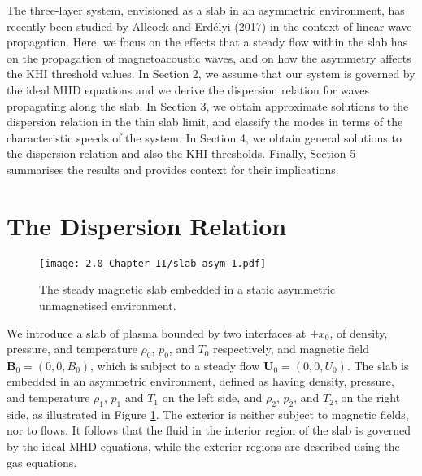 The three-layer system, envisioned as a slab in an asymmetric environment, has recently been studied by Allcock and Erd\'elyi (2017) in the context of linear wave propagation.
Here, we focus on the effects that a steady flow within the slab has on the propagation of magnetoacoustic waves, and on how the asymmetry affects the KHI threshold values.
In Section 2, we assume that our system is governed by the ideal MHD equations and we derive the dispersion relation for waves propagating along the slab.
In Section 3, we obtain approximate solutions to the dispersion relation in the thin slab limit, and classify the modes in terms of the characteristic speeds of the system.
In Section 4, we obtain general solutions to the dispersion relation and also the KHI thresholds.
Finally, Section 5 summarises the results and provides context for their implications.

\section{The Dispersion Relation}

\begin{figure}[t]
\centering
 \texttt{[image: 2.0\_Chapter\_II/slab\_asym\_1.pdf]}
 \caption{The steady magnetic slab embedded in a static asymmetric unmagnetised environment.}
 \label{slab}
\end{figure}

We introduce a slab of plasma bounded by two interfaces at $\pm x_0$, of density, pressure, and temperature $\rho_0$, $p_0$, and $T_0$ respectively, and magnetic field $\mathbf{B}_0 = (0, 0, B_0)$, which is subject to a steady flow $\mathbf{U}_0 = (0, 0, U_0)$.
The slab is embedded in an asymmetric environment, defined as having density, pressure, and temperature $\rho_1$, $p_1$ and $T_1$ on the left side, and $\rho_2$, $p_2$, and $T_2$, on the right side, as illustrated in Figure \ref{slab}.
The exterior is neither subject to magnetic fields, nor to flows.
It follows that the fluid in the interior region of the slab is governed by the ideal MHD equations, while the exterior regions are described using the gas equations.

